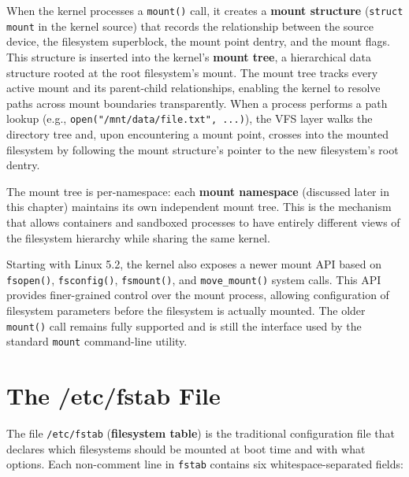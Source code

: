 When the kernel processes a \texttt{mount()} call, it creates a \textbf{mount structure} (\texttt{struct mount} in the kernel source) that records the relationship between the source device, the filesystem superblock, the mount point dentry, and the mount flags. This structure is inserted into the kernel's \textbf{mount tree}, a hierarchical data structure rooted at the root filesystem's mount. The mount tree tracks every active mount and its parent-child relationships, enabling the kernel to resolve paths across mount boundaries transparently. When a process performs a path lookup (e.g., \texttt{open("/mnt/data/file.txt", ...)}), the VFS layer walks the directory tree and, upon encountering a mount point, crosses into the mounted filesystem by following the mount structure's pointer to the new filesystem's root dentry.

The mount tree is per-namespace: each \textbf{mount namespace} (discussed later in this chapter) maintains its own independent mount tree. This is the mechanism that allows containers and sandboxed processes to have entirely different views of the filesystem hierarchy while sharing the same kernel.

Starting with Linux 5.2, the kernel also exposes a newer mount API based on \texttt{fsopen()}, \texttt{fsconfig()}, \texttt{fsmount()}, and \texttt{move\_mount()} system calls. This API provides finer-grained control over the mount process, allowing configuration of filesystem parameters before the filesystem is actually mounted. The older \texttt{mount()} call remains fully supported and is still the interface used by the standard \texttt{mount} command-line utility.

\section{The /etc/fstab File}

The file \texttt{/etc/fstab} (\textbf{filesystem table}) is the traditional configuration file that declares which filesystems should be mounted at boot time and with what options. Each non-comment line in \texttt{fstab} contains six whitespace-separated fields:

